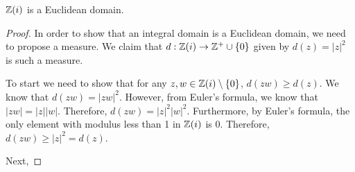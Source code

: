 \documentclass[notitlepage]{simple}
\begin{document}
\begin{thm}
	$\mathbb{Z}(i)$ is a Euclidean domain.
\end{thm}
\begin{proof}
	In order to show that an integral domain is a Euclidean domain, we need to propose a measure.
	We claim that $d:\mathbb{Z}(i)\rightarrow\mathbb{Z}^{+}\cup\lbrace 0 \rbrace$ given by $d(z)=|z|^2$ is such a measure.

	To start we need to show that for any $z,w\in\mathbb{Z}(i)\setminus\lbrace 0 \rbrace$, $d(zw)\geq d(z)$.
	We know that $d(zw)=|zw|^2$.
	However, from Euler's formula, we know that $|zw|=|z||w|$.
	Therefore, $d(zw)=|z|^2|w|^2$.
	Furthermore, by Euler's formula, the only element with modulus less than 1 in $\mathbb{Z}(i)$ is 0.
	Therefore, $d(zw)\geq |z|^2=d(z)$.

	Next,
\end{proof}
\end{document}
